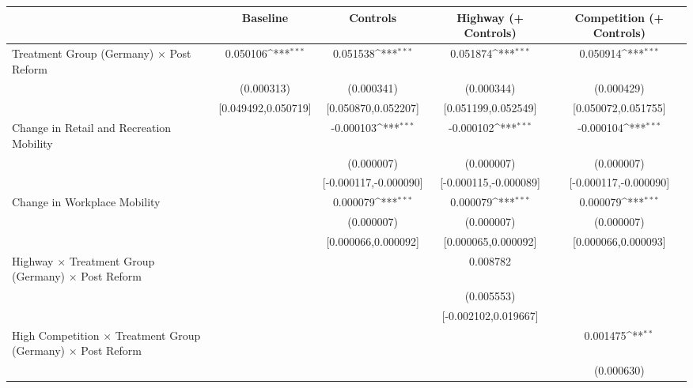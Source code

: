 {
\def\sym#1{\ifmmode^{#1}\else\(^{#1}\)\fi}
\begin{tabular}{l*{4}{c}}
\toprule
                    &\multicolumn{1}{c}{Baseline}&\multicolumn{1}{c}{Controls}&\multicolumn{1}{c}{Highway (+ Controls)}&\multicolumn{1}{c}{Competition (+ Controls)}\\
\midrule
Treatment Group (Germany) $\times$ Post Reform&    0.050106\sym{***}&    0.051538\sym{***}&    0.051874\sym{***}&    0.050914\sym{***}\\
                    &  (0.000313)         &  (0.000341)         &  (0.000344)         &  (0.000429)         \\
                    &[0.049492,0.050719]         &[0.050870,0.052207]         &[0.051199,0.052549]         &[0.050072,0.051755]         \\
Change in Retail and Recreation Mobility&                     &   -0.000103\sym{***}&   -0.000102\sym{***}&   -0.000104\sym{***}\\
                    &                     &  (0.000007)         &  (0.000007)         &  (0.000007)         \\
                    &                     &[-0.000117,-0.000090]         &[-0.000115,-0.000089]         &[-0.000117,-0.000090]         \\
Change in Workplace Mobility&                     &    0.000079\sym{***}&    0.000079\sym{***}&    0.000079\sym{***}\\
                    &                     &  (0.000007)         &  (0.000007)         &  (0.000007)         \\
                    &                     &[0.000066,0.000092]         &[0.000065,0.000092]         &[0.000066,0.000093]         \\
Highway $\times$ Treatment Group (Germany) $\times$ Post Reform&                     &                     &    0.008782         &                     \\
                    &                     &                     &  (0.005553)         &                     \\
                    &                     &                     &[-0.002102,0.019667]         &                     \\
High Competition $\times$ Treatment Group (Germany) $\times$ Post Reform&                     &                     &                     &    0.001475\sym{**} \\
                    &                     &                     &                     &  (0.000630)         \\

\end{tabular}}
